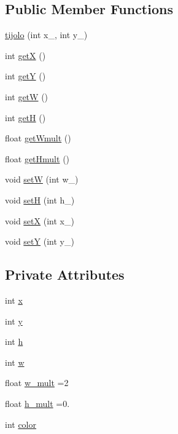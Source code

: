 \subsection*{Public Member Functions}
\begin{DoxyCompactItemize}
\item 
\hyperlink{classtijolo_a1575297d58f55111b16bfde06d7fcf14}{tijolo} (int x\+\_\+, int y\+\_\+)
\item 
int \hyperlink{classtijolo_ab3179398dd6fe44db34eb23556ccd029}{getX} ()
\item 
int \hyperlink{classtijolo_ad5d4edc964d42505990ab3c0e739f175}{getY} ()
\item 
int \hyperlink{classtijolo_a940e6fd9de3320009415b3ee5d9a89ea}{getW} ()
\item 
int \hyperlink{classtijolo_ad742e39614eec9ad0ac8d1e386fee696}{getH} ()
\item 
float \hyperlink{classtijolo_acb8367de6befb88b131e3cb8dd4be70f}{get\+Wmult} ()
\item 
float \hyperlink{classtijolo_ac3b530ef0293d8d5973fa2087c7ea9b9}{get\+Hmult} ()
\item 
void \hyperlink{classtijolo_a6f5eed3413774d0e4d9ee7505a0a68e3}{setW} (int w\+\_\+)
\item 
void \hyperlink{classtijolo_ac15a68731bbf0019493a54ab0bccb04d}{setH} (int h\+\_\+)
\item 
void \hyperlink{classtijolo_afce75411c77a0f53037c33e7a3321d4b}{setX} (int x\+\_\+)
\item 
void \hyperlink{classtijolo_ac1d41f557b4d2170dc4fd4ff53a78c13}{setY} (int y\+\_\+)
\end{DoxyCompactItemize}
\subsection*{Private Attributes}
\begin{DoxyCompactItemize}
\item 
int \hyperlink{classtijolo_acd39a70440853d5f019378ab501fb688}{x}
\item 
int \hyperlink{classtijolo_a3089987dab8db697303f88bd59c0989f}{y}
\item 
int \hyperlink{classtijolo_ad96e30c66b061844a9a3f3b60d4bfcf2}{h}
\item 
int \hyperlink{classtijolo_a11e0c9ba0ab09baad2622ba49de44f8a}{w}
\item 
float \hyperlink{classtijolo_a541d86c88882bb3be2199b10f840777c}{w\+\_\+mult} =2
\item 
float \hyperlink{classtijolo_a4c6684dc3837ed50b9111ccbd4e95d23}{h\+\_\+mult} =0.
\item 
int \hyperlink{classtijolo_aad4f2b8b44ee1df886b58a60b7a9f653}{color}
\end{DoxyCompactItemize}


